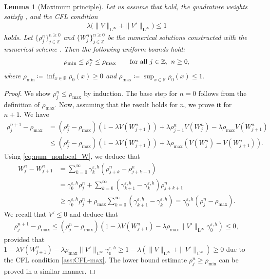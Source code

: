 \documentclass[10pt]{amsart}
\theoremstyle{plain}
\newtheorem{lemma}{Lemma}[section]
\theoremstyle{definition}
\numberwithin{equation}{section}
\newcommand{\eps}{{\varepsilon}}
\begin{document}
\begin{lemma}[Maximum principle]\label{lem:maxm_prcp}
Let us assume that  hold, the quadrature weights satisfy , and the CFL condition
\begin{align}\label{ass:CFL-max}
\lambda \Big(\|V\|_{\mathrm{L}^{\infty}} + \|V'\|_{\mathrm{L}^{\infty}}\Big) \leq1
\end{align} holds. Let $\{\rho_j^n\}_{j\in\mathbb{Z}}^{n\geq0}$ and $\{W_j^n\}_{j\in\mathbb{Z}}^{n\geq0}$ be the numerical solutions constructed with the numerical scheme . Then the following uniform bounds hold:
\begin{align*}
    \rho_{\mathrm{min}} \leq \rho_j^n \leq \rho_{\mathrm{max}} \qquad \textnormal{for all } j\in\mathbb{Z}, \ n\geq0,
\end{align*}
where $\rho_{\mathrm{min}}\coloneqq\inf_{x\in\mathbb{R}}\rho_0(x)\geq0$ and $\rho_{\mathrm{max}}\coloneqq\sup_{x\in\mathbb{R}}\rho_0(x)\leq1$.
\end{lemma}

\begin{proof}
We show $\rho_j^n \leq \rho_{\mathrm{max}}$ by induction. The base step for $n = 0$ follows from the definition of $\rho_{\mathrm{max}}$. Now, assuming that the result holds for $n$, we prove it for $n+1$. We have
\begin{align*}
\rho_j^{n+1} - \rho_{\mathrm{max}} &= (\rho_j^n - \rho_{\mathrm{max}}) \left(1 - \lambda V(W_{j+1}^n)\right) + \lambda \rho_{j-1}^n V(W_j^n) - \lambda \rho_{\mathrm{max}} V(W_{j+1}^n) \\
&\leq (\rho_j^n - \rho_{\mathrm{max}}) \left(1 - \lambda V(W_{j+1}^n)\right) + \lambda \rho_{\mathrm{max}}  \left( V(W_j^n) - V(W_{j+1}^n) \right).
\end{align*}
Using \cref{eq:num_nonlocal_W}, we deduce that 
\begin{align*}
    W_j^n - W_{j+1}^n &= \sum_{k=0}^\infty \gamma_k^{\eps,h} (\rho_{j+k}^n - \rho_{j+k+1}^n) 
    \\ &= \gamma_0^{\eps,h} \rho_j^n + \sum_{k=0}^\infty (\gamma_{k+1}^{\eps,h} - \gamma_k^{\eps,h}) \rho^n_{j+k+1} \\
    &\ge \gamma_0^{\eps,h} \rho_j^n + \rho_{\mathrm{max}} \sum_{k=0}^\infty (\gamma_{k+1}^{\eps,h}-\gamma_k^{\eps,h}) = \gamma_0^{\eps,h} (\rho_j^n - \rho_{\mathrm{max}}).
\end{align*}
We recall that $V' \leq 0$ and deduce that
\begin{align*}
    \rho_j^{n+1} - \rho_{\mathrm{max}} \leq (\rho_j^n - \rho_{\mathrm{max}}) \left(1 - \lambda V(W_{j+1}^n) - \lambda \rho_{\mathrm{max}}  \|V'\|_{\mathrm{L}^\infty} \gamma_0^{\eps,h} \right) \leq 0, 
\end{align*}
provided that $1 - \lambda V(W_{j+1}^n) - \lambda \rho_{\mathrm{max}}  \|V'\|_{\mathrm{L}^\infty} \gamma_0^{\eps,h} \geq 1 - \lambda \left(\|V\|_{\mathrm{L}^{\infty}} + \|V'\|_{\mathrm{L}^{\infty}}\right)\geq0$ due to the CFL condition \cref{ass:CFL-max}.
The lower bound estimate $\rho_j^n \geq \rho_{\mathrm{min}}$ can be proved in a similar manner.
\end{proof}
\end{document}
